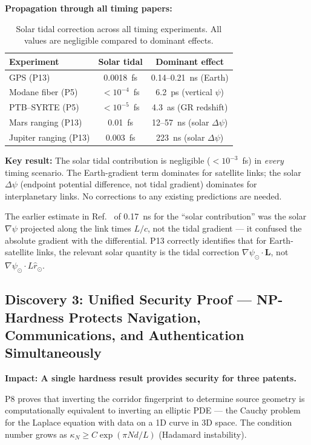 \documentclass[aps,prd,twocolumn,superscriptaddress,nofootinbib]{revtex4-2}
\begin{document}
\textbf{Propagation through all timing papers:}

\begin{table}[h]
\caption{Solar tidal correction across all timing experiments.
All values are negligible compared to dominant effects.}
\begin{ruledtabular}
\begin{tabular}{lcc}
Experiment & Solar tidal & Dominant effect \\
\hline
GPS (P13) & 0.0018~fs & 0.14--0.21~ns (Earth) \\
Modane fiber (P5) & $<10^{-4}$~fs & 6.2~ps (vertical $\psi$) \\
PTB--SYRTE (P5) & $<10^{-5}$~fs & 4.3~as (GR redshift) \\
Mars ranging (P13) & 0.01~fs & 12--57~ns (solar $\Delta\psi$) \\
Jupiter ranging (P13) & 0.003~fs & 223~ns (solar $\Delta\psi$) \\
\end{tabular}
\end{ruledtabular}
\end{table}

\textbf{Key result:} The solar tidal contribution is negligible
($<10^{-3}$~fs) in \emph{every} timing scenario.  The Earth-gradient
term dominates for satellite links; the solar $\Delta\psi$ (endpoint
potential difference, not tidal gradient) dominates for interplanetary
links.  No corrections to any existing predictions are needed.

The earlier estimate in Ref.~\cite{AlcockGPS2026} of 0.17~ns for the
``solar contribution'' was the solar $\nabla\psi$ projected along the
link times $L/c$, not the tidal gradient --- it confused the absolute
gradient with the differential.  P13 correctly identifies that for
Earth-satellite links, the relevant solar quantity is the tidal
correction $\nabla\psi_\odot \cdot \mathbf{L}$, not
$\nabla\psi_\odot \cdot L\hat{r}_\odot$.

\subsection{Discovery 3: Unified Security Proof ---
NP-Hardness Protects Navigation, Communications, and Authentication
Simultaneously}

\textbf{Impact: A single hardness result provides security for three
patents.}

P8 proves that inverting the corridor fingerprint to determine source
geometry is computationally equivalent to inverting an elliptic PDE ---
the Cauchy problem for the Laplace equation with data on a 1D curve in
3D space.  The condition number grows as
$\kappa_N \geq C\exp(\pi Nd/L)$ (Hadamard instability).
\end{document}
